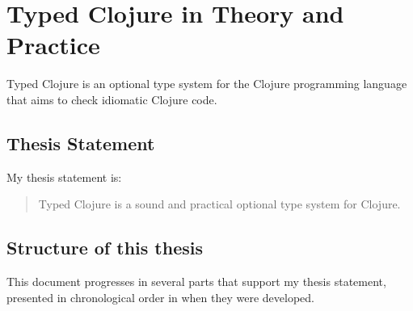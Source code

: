 \chapter*{Typed Clojure in Theory and Practice}

Typed Clojure is an optional type system for the Clojure programming language
that aims to check idiomatic Clojure code.

\section*{Thesis Statement}

My thesis statement is:

\begin{quote}
Typed Clojure is a sound and practical optional type system for Clojure.
\end{quote}

%

\section*{Structure of this thesis}

This document progresses in several parts that support my thesis statement, presented in chronological order
in when they were developed.

